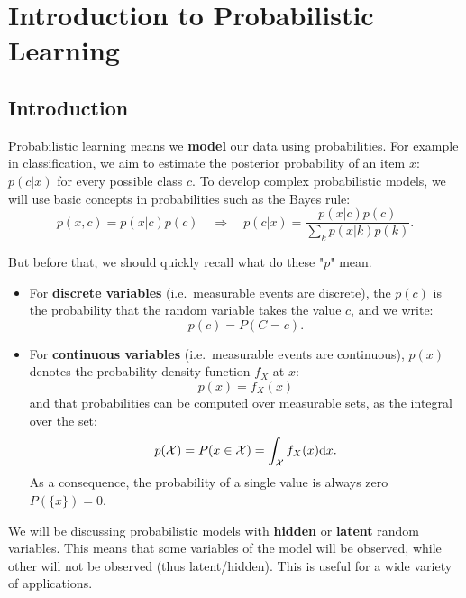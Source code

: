 \chapter{Introduction to Probabilistic Learning}
\label{ch:intro}
\section{Introduction}

Probabilistic learning means we {\bf model} our data  using probabilities. For example in classification, we aim to estimate the posterior probability of an item $x$: $p(c|x)$ for every possible class $c$. To develop complex probabilistic models, we will use basic concepts in probabilities such as the Bayes rule:
\begin{equation}
p(x,c) = p(x|c)p(c) \quad\Rightarrow\quad p(c|x) = \frac{p(x|c)p(c)}{\sum\limits_k p(x|k)p(k)}. \label{eq:bayes-rule} 
\end{equation}

But before that, we should quickly recall what do these "$p$" mean.
\begin{itemize}
 \item For {\bf discrete variables} (i.e.\ measurable events are discrete), the $p(c)$ is the probability that the random variable takes the value $c$, and we write:
\begin{equation} p(c) = P(C=c). \end{equation}
\item For {\bf continuous variables} (i.e.\ measurable events are continuous), $p(x)$ denotes the probability density function $f_X$ at $x$:
\begin{equation} p(x) = f_X(x) \end{equation}
and that probabilities can be computed over measurable sets, as the integral over the set:
\begin{equation} p({\cal X})=P(x\in{\cal X})=\int_{\cal X}f_X(x)\textrm{d}x. \end{equation}
As a consequence, the probability of a single value is always zero $P(\{x\})=0$.
\end{itemize}

We will be discussing probabilistic models with \textbf{hidden} or \textbf{latent} random variables. This means that some variables of the model will be observed, while other will not be observed (thus latent/hidden). This is useful for a wide variety of applications.

